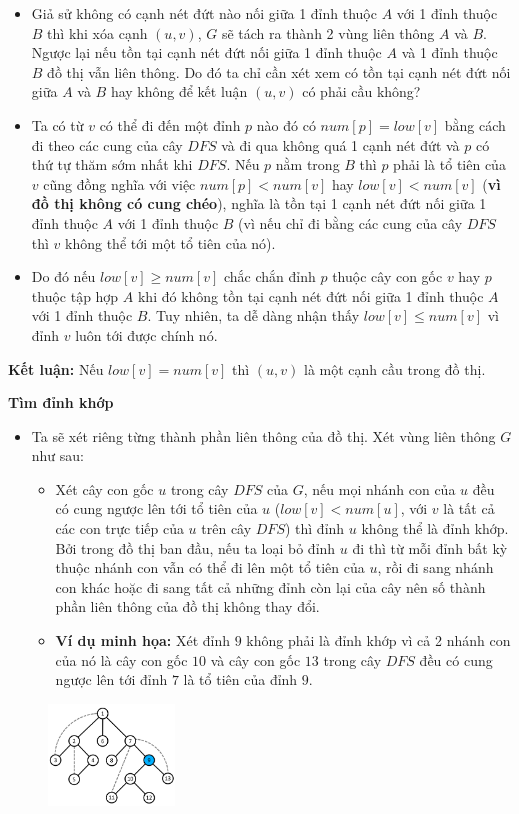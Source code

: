\documentclass{article}
\begin{document}
\begin{itemize}
    \item Giả sử không có cạnh nét đứt nào nối giữa 1 đỉnh thuộc $A$ với 1 đỉnh thuộc $B$ thì khi xóa cạnh $(u, v)$, $G$ sẽ tách ra thành 2 vùng liên thông $A$ và $B$. Ngược lại nếu tồn tại cạnh nét đứt nối giữa 1 đỉnh thuộc $A$ và 1 đỉnh thuộc $B$ đồ thị vẫn liên thông. Do đó ta chỉ cần xét xem có tồn tại cạnh nét đứt nối giữa $A$ và $B$ hay không để kết luận $(u, v)$ có phải cầu không?
    \item Ta có từ $v$ có thể đi đến một đỉnh $p$ nào đó có $num[p] = low[v]$ bằng cách đi theo các cung của cây $DFS$ và đi qua không quá 1 cạnh nét đứt và $p$ có thứ tự thăm sớm nhất khi $DFS$. Nếu $p$ nằm trong $B$ thì $p$ phải là tổ tiên của $v$ cũng đồng nghĩa với việc $num[p] < num[v]$ hay $low[v] < num[v]$ (\textbf{vì đồ thị không có cung chéo}), nghĩa là tồn tại 1 cạnh nét đứt nối giữa 1 đỉnh thuộc $A$ với 1 đỉnh thuộc $B$ (vì nếu chỉ đi bằng các cung của cây $DFS$ thì $v$ không thể tới một tổ tiên của nó).
    \item Do đó nếu $low[v] \geq num[v]$ chắc chắn đỉnh $p$ thuộc cây con gốc $v$ hay $p$ thuộc tập hợp $A$ khi đó không tồn tại cạnh nét đứt nối giữa 1 đỉnh thuộc $A$ với 1 đỉnh thuộc $B$. Tuy nhiên, ta dễ dàng nhận thấy $low[v] \leq num[v]$ vì đỉnh $v$ luôn tới được chính nó.
\end{itemize}

\noindent\textbf{Kết luận:} Nếu $low[v] = num[v]$ thì $(u, v)$ là một cạnh cầu trong đồ thị.

\textbf{Tìm đỉnh khớp}
\begin{itemize}
    \item Ta sẽ xét riêng từng thành phần liên thông của đồ thị. Xét vùng liên thông $G$ như sau:
    \begin{itemize}
        \item Xét cây con gốc $u$ trong cây $DFS$ của $G$, nếu mọi nhánh con của $u$ đều có cung ngược lên tới tổ tiên của $u$ ($low[v] < num[u]$, với $v$ là tất cả các con trực tiếp của $u$ trên cây $DFS$) thì đỉnh $u$ không thể là đỉnh khớp. Bởi trong đồ thị ban đầu, nếu ta loại bỏ đỉnh $u$ đi thì từ mỗi đỉnh bất kỳ thuộc nhánh con vẫn có thể đi lên một tổ tiên của $u$, rồi đi sang nhánh con khác hoặc đi sang tất cả những đỉnh còn lại của cây nên số thành phần liên thông của đồ thị không thay đổi.
        \item \textbf{Ví dụ minh họa:} Xét đỉnh $9$ không phải là đỉnh khớp vì cả 2 nhánh con của nó là cây con gốc $10$ và cây con gốc $13$ trong cây $DFS$ đều có cung ngược lên tới đỉnh $7$ là tổ tiên của đỉnh $9$.
    \end{itemize}
\end{itemize}
\begin{figure}[h]   
    \centering
    \includegraphics[width=0.3\textwidth]{img/b4/Depth-First-Search-Tree_img7.png}
\end{figure}
\end{document}
